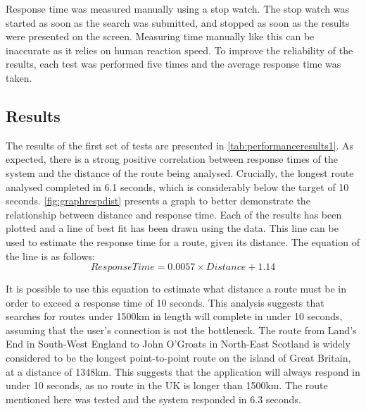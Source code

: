\documentclass[authoryearcitations]{UoYCSproject}
\begin{document}
Response time was measured manually using a stop watch. The stop watch was started as soon as the search was submitted, and stopped as soon as the results were presented on the screen. Measuring time manually like this can be inaccurate as it relies on human reaction speed. To improve the reliability of the results, each test was performed five times and the average response time was taken.

\subsection{Results}

The results of the first set of tests are presented in \autoref{tab:performanceresults1}. As expected, there is a strong positive correlation between response times of the system and the distance of the route being analysed. Crucially, the longest route analysed completed in 6.1 seconds, which is considerably below the target of 10 seconds. \autoref{fig:graphrespdist} presents a graph to better demonstrate the relationship between distance and response time. Each of the results has been plotted and a line of best fit has been drawn using the data. This line can be used to estimate the response time for a route, given its distance. The equation of the line is as follows:
$$ Response Time = 0.0057\times Distance + 1.14$$

It is possible to use this equation to estimate what distance a route must be in order to exceed a response time of 10 seconds. This analysis suggests that searches for routes under 1500km in length will complete in under 10 seconds, assuming that the user's connection is not the bottleneck. The route from Land's End in South-West England to John O'Groats in North-East Scotland is widely considered to be the longest point-to-point route on the island of Great Britain, at a distance of 1348km. This suggests that the application will always respond in under 10 seconds, as no route in the UK is longer than 1500km. The route mentioned here was tested and the system responded in 6.3 seconds. 
\end{document}
